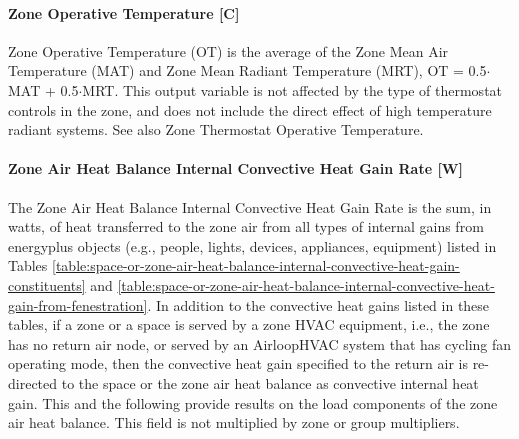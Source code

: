 \paragraph{Zone Operative Temperature {[}C{]}}\label{zone-operative-temperature-c}

Zone Operative Temperature (OT) is the average of the Zone Mean Air Temperature (MAT) and Zone Mean Radiant Temperature (MRT), OT = 0.5$\cdot$MAT + 0.5$\cdot$MRT. This output variable is not affected by the type of thermostat controls in the zone, and does not include the direct effect of high temperature radiant systems. See also Zone Thermostat Operative Temperature.

\paragraph{Zone Air Heat Balance Internal Convective Heat Gain Rate {[}W{]}}\label{zone-air-heat-balance-internal-convective-heat-gain-rate-w}

The Zone Air Heat Balance Internal Convective Heat Gain Rate is the sum, in watts, of heat transferred to the zone air from all types of internal gains from energyplus objects (e.g., people, lights, devices, appliances, equipment) listed in Tables \ref{table:space-or-zone-air-heat-balance-internal-convective-heat-gain-constituents} and \ref{table:space-or-zone-air-heat-balance-internal-convective-heat-gain-from-fenestration}. In addition to the convective heat gains listed in these tables, if a zone or a space is served by a zone HVAC equipment, i.e., the zone has no return air node, or served by an AirloopHVAC system that has cycling fan operating mode, then the convective heat gain specified to the return air is re-directed to the space or the zone air heat balance as convective internal heat gain. This and the following provide results on the load components of the zone air heat balance. This field is not multiplied by zone or group multipliers.

